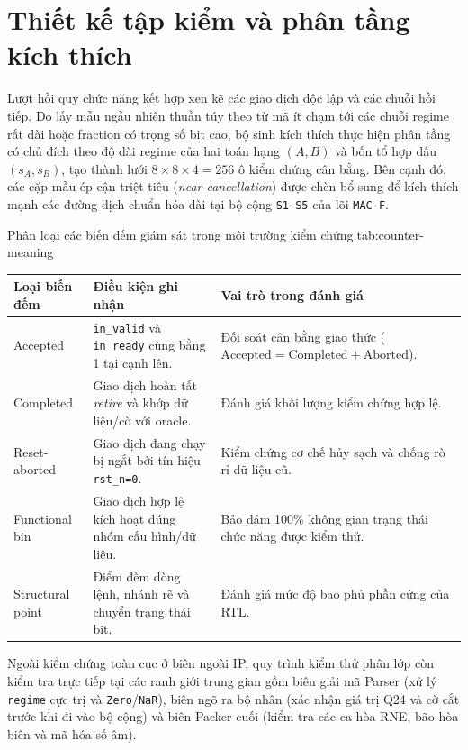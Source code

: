 \section{Thiết kế tập kiểm và phân tầng kích thích}

Lượt hồi quy chức năng kết hợp xen kẽ các giao dịch độc lập và các chuỗi hồi tiếp.
Do lấy mẫu ngẫu nhiên thuần túy theo từ mã ít chạm tới các chuỗi regime rất dài
hoặc fraction có trọng số bit cao, bộ sinh kích thích thực hiện phân tầng có
chủ đích theo độ dài regime của hai toán hạng $(A,B)$ và bốn tổ hợp dấu $(s_A,s_B)$,
tạo thành lưới $8\times 8\times 4 = 256$ ô kiểm chứng cân bằng. Bên cạnh đó, các
cặp mẫu ép cận triệt tiêu (\textit{near-cancellation}) được chèn bổ sung để kích
thích mạnh các đường dịch chuẩn hóa dài tại bộ cộng \texttt{S1--S5} của lõi \texttt{MAC-F}.

\begin{engineeringtable}{Phân loại các biến đếm giám sát trong môi trường kiểm chứng.}{tab:counter-meaning}
\begin{tabularx}{\linewidth}{@{}>{\raggedright\arraybackslash}p{36mm}Y Y@{}}
\toprule
Loại biến đếm & Điều kiện ghi nhận & Vai trò trong đánh giá \\
\midrule
Accepted & \texttt{in\_valid} và \texttt{in\_ready} cùng bằng 1 tại cạnh lên. & Đối soát cân bằng giao thức ($\mathrm{Accepted} = \mathrm{Completed} + \mathrm{Aborted}$). \\
Completed & Giao dịch hoàn tất \textit{retire} và khớp dữ liệu/cờ với oracle. & Đánh giá khối lượng kiểm chứng hợp lệ. \\
Reset-aborted & Giao dịch đang chạy bị ngắt bởi tín hiệu \texttt{rst\_n=0}. & Kiểm chứng cơ chế hủy sạch và chống rò rỉ dữ liệu cũ. \\
Functional bin & Giao dịch hợp lệ kích hoạt đúng nhóm cấu hình/dữ liệu. & Bảo đảm 100\% không gian trạng thái chức năng được kiểm thử. \\
Structural point & Điểm đếm dòng lệnh, nhánh rẽ và chuyển trạng thái bit. & Đánh giá mức độ bao phủ phần cứng của RTL. \\
\bottomrule
\end{tabularx}
\end{engineeringtable}

Ngoài kiểm chứng toàn cục ở biên ngoài IP, quy trình kiểm thử phân lớp còn kiểm
tra trực tiếp tại các ranh giới trung gian gồm biên giải mã Parser (xử lý
\texttt{regime} cực trị và \texttt{Zero}/\texttt{NaR}), biên ngõ ra bộ nhân
(xác nhận giá trị Q24 và cờ cắt trước khi đi vào bộ cộng) và biên Packer cuối
(kiểm tra các ca hòa RNE, bão hòa biên và mã hóa số âm).
